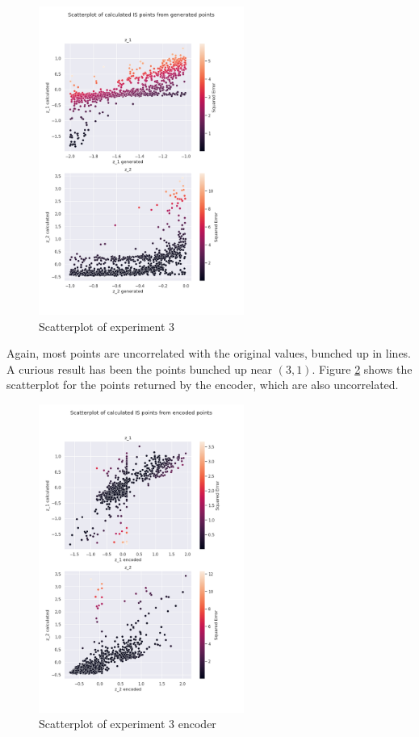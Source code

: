 \begin{figure}[H]
    \centering
    \includegraphics[width=0.6\textwidth]{Cap5/scatterplot3}
    \caption{Scatterplot of experiment 3}
    \label{fig:scatter_exp3}
\end{figure}

Again, most points are uncorrelated with the original values, bunched up in lines. A curious result has been the points bunched up near $(3, 1)$. Figure \ref{fig:scatter_enc_exp3} shows the scatterplot for the points returned by the encoder, which are also uncorrelated.

\begin{figure}[H]
    \centering
    \includegraphics[width=0.6\textwidth]{Cap5/scatterplot_enc3}
    \caption{Scatterplot of experiment 3 encoder}
    \label{fig:scatter_enc_exp3}
\end{figure}